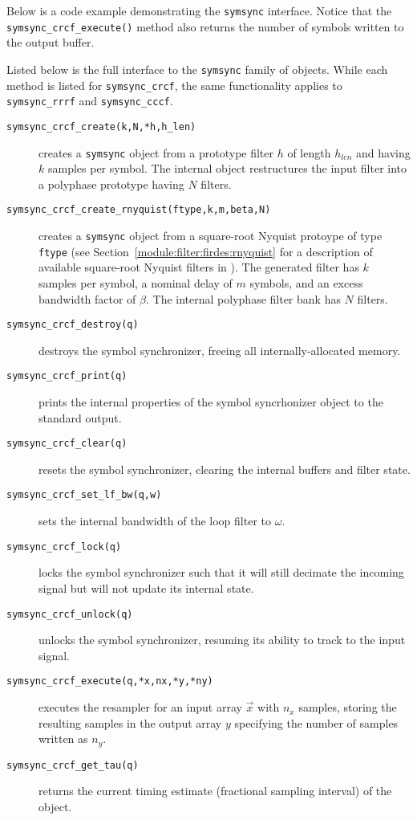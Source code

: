 Below is a code example demonstrating the {\tt symsync} interface.
Notice that the {\tt symsync\_crcf\_execute()} method also returns the
number of symbols written to the output buffer.
%

%
Listed below is the full interface to the {\tt symsync} family of
objects.
While each method is listed for {\tt symsync\_crcf}, the same
functionality applies to {\tt symsync\_rrrf} and {\tt symsync\_cccf}.
%
\begin{description}
\item[{\tt symsync\_crcf\_create(k,N,*h,h\_len)}]
    creates a {\tt symsync} object from a prototype filter $h$ of length
    $h_{len}$ and having $k$ samples per symbol.
    The internal object restructures the input filter into a polyphase
    prototype having $N$ filters.
\item[{\tt symsync\_crcf\_create\_rnyquist(ftype,k,m,beta,N)}]
    creates a {\tt symsync} object from a square-root Nyquist protoype
    of type {\tt ftype} (see Section~\ref{module:filter:firdes:rnyquist}
    for a description of available square-root Nyquist filters in
    \liquid).
    The generated filter has $k$ samples per symbol,
    a nominal delay of $m$ symbols, and an excess bandwidth factor of
    $\beta$.
    The internal polyphase filter bank has $N$ filters.
\item[{\tt symsync\_crcf\_destroy(q)}]
    destroys the symbol synchronizer, freeing all internally-allocated
    memory.
\item[{\tt symsync\_crcf\_print(q)}]
    prints the internal properties of the symbol syncrhonizer object to
    the standard output.
\item[{\tt symsync\_crcf\_clear(q)}]
    resets the symbol synchronizer, clearing the internal buffers and
    filter state.
\item[{\tt symsync\_crcf\_set\_lf\_bw(q,w)}]
    sets the internal bandwidth of the loop filter to $\omega$.
\item[{\tt symsync\_crcf\_lock(q)}]
    locks the symbol synchronizer such that it will still decimate the
    incoming signal but will not update its internal state.
\item[{\tt symsync\_crcf\_unlock(q)}]
    unlocks the symbol synchronizer, resuming its ability to track to
    the input signal.
\item[{\tt symsync\_crcf\_execute(q,*x,nx,*y,*ny)}]
    executes the resampler for an input array $\vec{x}$ with $n_x$
    samples,
    storing the resulting samples in the output array $y$
    specifying the number of samples written as $n_y$.
\item[{\tt symsync\_crcf\_get\_tau(q)}]
    returns the current timing estimate (fractional sampling interval)
    of the object.
\end{description}
